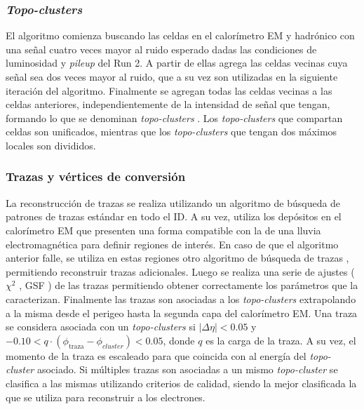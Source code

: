 \subsubsection{\textit{Topo-clusters}}

El algoritmo comienza buscando las celdas en el calorímetro EM y hadrónico con una señal cuatro veces mayor al ruido esperado dadas las condiciones de luminosidad y \textit{pileup} del Run 2. A partir de ellas agrega las celdas vecinas cuya señal sea dos veces mayor al ruido, que a su vez son utilizadas en la siguiente iteración del algoritmo. Finalmente se agregan todas las celdas vecinas a las celdas anteriores, independientemente de la intensidad de señal que tengan, formando lo que se denominan \textit{topo-clusters} \cite{PERF-2014-07, Lampl:1099735}. Los \textit{topo-clusters} que compartan celdas son unificados, mientras que los \textit{topo-clusters} que tengan dos máximos locales son divididos.


\subsubsection{Trazas y vértices de conversión}

La reconstrucción de trazas se realiza utilizando un algoritmo de búsqueda de patrones de trazas estándar \cite{ATL-SOFT-PUB-2007-007, PERF-2017-02, PERF-2017-01} en todo el ID. A su vez, utiliza los depósitos en el calorímetro EM que presenten una forma compatible con la de una lluvia electromagnética para definir regiones de interés. En caso de que el algoritmo anterior falle, se utiliza en estas regiones otro algoritmo de búsqueda de trazas \cite{Kalman}, permitiendo reconstruir trazas adicionales. Luego se realiza una serie de ajustes ($\chi^2$ \cite{chi2}, GSF \cite{gsf}) de las trazas permitiendo obtener correctamente los parámetros que la caracterizan. Finalmente las trazas son asociadas a los \textit{topo-clusters} extrapolando a la misma desde el perigeo hasta la segunda capa del calorímetro EM. Una traza se considera asociada con un \textit{topo-clusters} si $|\Delta\eta|<0.05$ y $-0.10<q\cdot(\phi_{\text{traza}}-\phi_{cluster})<0.05$, donde $q$ es la carga de la traza. A su vez, el momento de la traza es escaleado para que coincida con al energía del \textit{topo-cluster} asociado. Si múltiples trazas son asociadas a un mismo \textit{topo-cluster} se clasifica a las mismas utilizando criterios de calidad, siendo la mejor clasificada la que se utiliza para reconstruir a los electrones. 

